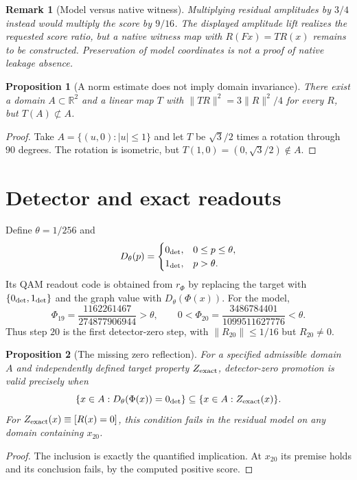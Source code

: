 \documentclass[11pt,a4paper]{article}
\newtheorem{proposition}{Proposition}
\newtheorem{remark}{Remark}
\begin{document}
\begin{remark}[Model versus native witness]
Multiplying residual amplitudes by $3/4$ instead would multiply the score by
$9/16$. The displayed amplitude lift realizes the requested score ratio,
but a native witness map with $R(Fx)=TR(x)$ remains to be constructed.
Preservation of model coordinates is not a proof of native leakage absence.
\end{remark}

\begin{proposition}[A norm estimate does not imply domain invariance]
There exist a domain $A\subset\mathbb R^2$ and a linear map $T$ with
$\|TR\|^2=3\|R\|^2/4$ for every $R$, but $T(A)\not\subset A$.
\end{proposition}
\begin{proof}
Take $A=\{(u,0):|u|\le1\}$ and let $T$ be $\sqrt3/2$ times a
rotation through $90$ degrees. The rotation is isometric, but
$T(1,0)=(0,\sqrt3/2)\notin A$.
\end{proof}

\section{Detector and exact readouts}
Define $\theta=1/256$ and
\[
D_\theta(p)=\begin{cases}0_{\rm det},&0\le p\le\theta,\\
1_{\rm det},&p>\theta.\end{cases}
\]
Its QAM readout code is obtained from $r_\Phi$ by replacing the target with
$\{0_{\rm det},1_{\rm det}\}$ and the graph value with $D_\theta(\Phi(x))$.
For the model,
\[
\Phi_{19}=\frac{1162261467}{274877906944}>\theta,\qquad
0<\Phi_{20}=\frac{3486784401}{1099511627776}<\theta.
\]
Thus step $20$ is the first detector-zero step, with
$\|R_{20}\|\le1/16$ but $R_{20}\ne0$.

\begin{proposition}[The missing zero reflection]
For a specified admissible domain $A$ and independently defined target
property $Z_{\rm exact}$, detector-zero promotion is valid precisely when
\[
\{x\in A:D_\theta(\Phi(x))=0_{\rm det}\}
\subseteq\{x\in A:Z_{\rm exact}(x)\}.
\]
For $Z_{\rm exact}(x)\equiv[R(x)=0]$, this condition fails in the residual
model on any domain containing $x_{20}$.
\end{proposition}
\begin{proof}
The inclusion is exactly the quantified implication. At $x_{20}$ its premise
holds and its conclusion fails, by the computed positive score.
\end{proof}
\end{document}
